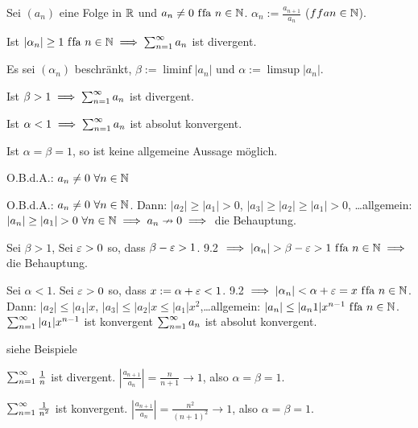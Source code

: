 \documentclass[a4paper,twoside,DIV15,BCOR12mm]{scrbook}
\begin{document}
\begin{satz}[Quotientenkriterium]

Sei $(a_n)$ eine Folge in $\mathbb{R}$ und $a_n \ne 0 \text{ f\/fa } n\in\mathbb{N}$. $\alpha_n := \frac{a_{n+1}}{a_n}$ ($ffa n\in\mathbb{N}$).
\begin{liste}
\item Ist $|\alpha_n| \ge 1 \text{ f\/fa }n\in\mathbb{N} \implies \sum_{n=1}^{\infty}{a_n}$ ist divergent.
\item Es sei $(\alpha_n)$ beschränkt, $\beta := \liminf |a_n|$ und $\alpha := \limsup |a_n|$.
\begin{liste}
\item Ist $\beta > 1 \implies \sum_{n=1}^{\infty}{a_n}$ ist divergent.
\item Ist $\alpha < 1 \implies \sum_{n=1}^{\infty}{a_n}$ ist absolut konvergent.
\item Ist $\alpha = \beta = 1$, so ist keine allgemeine Aussage möglich.
\end{liste}
\end{liste}
\end{satz}

\begin{beweis}
O.B.d.A.: $a_n \ne 0 \ \forall\natn$
\begin{liste}
\item O.B.d.A.: $a_n \ne 0 \ \forall\natn$. Dann: $|a_2|\ge |a_1|>0$, $|a_3|\ge|a_2|\ge|a_1|>0$, \ldots allgemein: $|a_n|\ge|a_1|>0\ \forall\natn \folgt a_n\nrightarrow 0 \folgt$ die Behauptung.
\item 
\begin{liste}
\item Sei $\beta >1$, Sei $\varepsilon>0$ so, dass $\beta-\varepsilon>1$. 9.2 $\folgt |\alpha_n|>\beta-\ep>1 \ffa n\in\MdN \folgt$ die Behauptung.
\item Sei $\alpha < 1$. Sei $\varepsilon>0$ so, dass $x:=\alpha+\varepsilon<1$. 9.2 $\implies |\alpha_n|<\alpha+\varepsilon=x \text{ f\/fa }n\in\mathbb{N}$. Dann: $|a_2|\le|a_1|x$, $|a_3|\le|a_2|x\le|a_1|x^2$,\ldots allgemein: $|a_n|\le|a_n1|x^{n-1} \text{ f\/fa }n\in\mathbb{N}$. $\sum_{n=1}^{\infty}{|a_1|x^{n-1}}$ ist konvergent  $\sum_{n=1}^{\infty}{a_n}$ ist absolut konvergent.
\item siehe Beispiele
\end{liste}
\end{liste}
\end{beweis}

\begin{beispiele}
\item $\sum_{n=1}^{\infty}{\frac{1}{n}}$ ist divergent. $\left|\frac{a_{n+1}}{a_n}\right| = \frac{n}{n+1} \to 1$, also $\alpha = \beta = 1$.
\item $\sum_{n=1}^{\infty}{\frac{1}{n^2}}$ ist konvergent. $\left|\frac{a_{n+1}}{a_n}\right| = \frac{n^2}{(n+1)^2} \to 1$, also $\alpha = \beta = 1$.
\end{beispiele}
\end{document}
